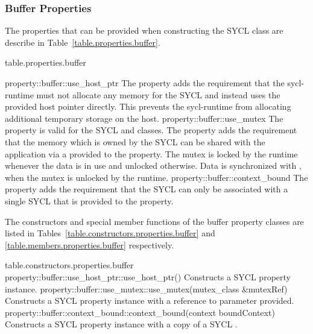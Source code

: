 \subsubsection{Buffer Properties}
\label{sec:buffer-properties}

The properties that can be provided when constructing the SYCL  class are describe in Table~\ref{table.properties.buffer}.

 {table.properties.buffer}

\addRow
  { property::buffer::use_host_ptr }
  {
    The  property adds the requirement that the \gls{sycl-runtime} must not allocate any memory for the SYCL  and instead uses the provided host pointer directly. This prevents the \gls{sycl-runtime} from allocating additional temporary storage on the host.
  }
\addRow
  { property::buffer::use_mutex }
  {
    The  property is valid for the SYCL  and  classes. The property adds the requirement that the memory which is owned by the SYCL  can be shared with the application via a  provided to the property. The mutex  is locked by the runtime whenever the data is in use and unlocked otherwise. Data is synchronized with , when the mutex is unlocked by the runtime.
  }
\addRow
  { property::buffer::context_bound }
  {
    The  property adds the requirement that the SYCL  can only be associated with a single SYCL  that is provided to the property.
  }
\completeTable

The constructors and special member functions of the buffer property
classes are listed in
Tables~\ref{table.constructors.properties.buffer} and
\ref{table.members.properties.buffer} respectively.

{table.constructors.properties.buffer}
\addRow
{property::buffer::use_host_ptr::use_host_ptr()}
{
  Constructs a SYCL  property instance.
}
\addRow
{property::buffer::use_mutex::use_mutex(mutex_class \&mutexRef)}
{
  Constructs a SYCL  property instance with a reference to  parameter provided.
}
\addRow
{property::buffer::context_bound::context_bound(context boundContext)}
{
  Constructs a SYCL  property instance with a copy of a SYCL .
}
\completeTable

